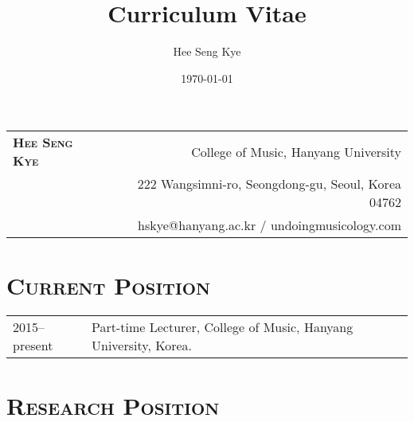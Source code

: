 \documentclass[a4paper,11pt]{article}
\title{Curriculum Vitae}
\author{Hee Seng Kye}
\date{\today}
\begin{document}
  \renewcommand{\headrulewidth}{0pt}
  \fancyhf{}
 
  \fancyfoot[RE,RO]{\small \thepage}
  
  \raggedright \parindent=15pt
  
%  
%  
  
  \hspace*{-0.8cm}
  \begin{tabular}{p{7.26cm} r}
    {\LARGE \textsc{\textbf{Hee Seng Kye}}} & College of Music, Hanyang University\\
    & 222 Wangsimni-ro, Seongdong-gu, Seoul, Korea 04762\\
    & hskye@hanyang.ac.kr / undoingmusicology.com
  \end{tabular}
  
  \vspace{10mm}
  
  \section*{\textsc{Current Position}}
  
  \hspace*{-0.25cm}
  \begin{tabular}{p{2.5cm} l}
    2015--present & Part-time Lecturer, College of Music, Hanyang University, Korea.
  \end{tabular}
  
  \vspace*{2.5mm}
  
  \section*{\textsc{Research Position}}
  
\end{document}
